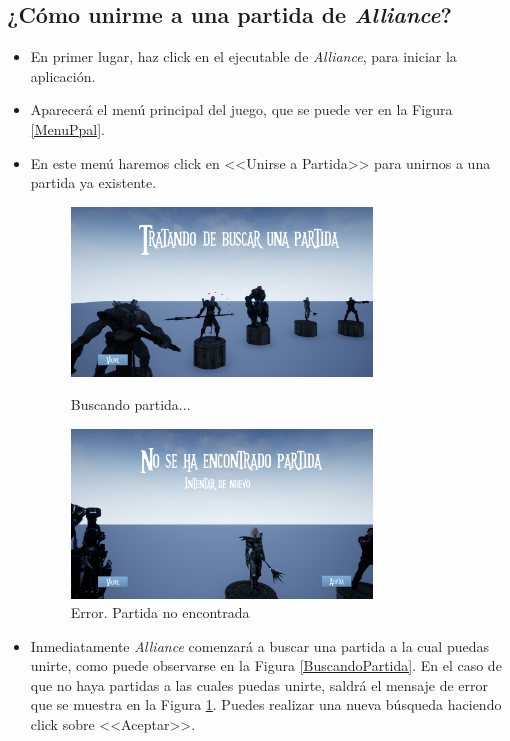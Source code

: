 \pagestyle{notsection}

\subsection{¿Cómo unirme a una partida de \textit{Alliance}?}

\begin{itemize}
\item En primer lugar, haz click en el ejecutable de \textit{Alliance}, para iniciar la aplicación.
\item Aparecerá el menú principal del juego, que se puede ver en la Figura \ref{MenuPpal}.
\item En este menú haremos click en <<Unirse a Partida>> para unirnos a una partida ya existente.

\begin{figure}[H]
  \begin{minipage}{0.5\textwidth}
    \centering
    \includegraphics[width=8cm]{./images/BuscandoPartida.png}
    \caption{Buscando partida...}
    \label{BuscandoPartida}
  \end{minipage}%
  \hspace{1mm}
  \begin{minipage}{0.5\textwidth}
    \centering
    \includegraphics[width=8cm]{./images/PartidaNoEncontrada.png}
    \caption{Error. Partida no encontrada}
    \label{PartidaNoEncontrada}
  \end{minipage}
\end{figure}

\item Inmediatamente \textit{Alliance} comenzará a buscar una partida a la cual puedas unirte, como puede observarse en la Figura \ref{BuscandoPartida}. En el caso de que no haya partidas a las cuales puedas unirte, saldrá el mensaje de error que se muestra en la Figura \ref{PartidaNoEncontrada}. Puedes realizar una nueva búsqueda haciendo click sobre <<Aceptar>>.


\end{itemize}
